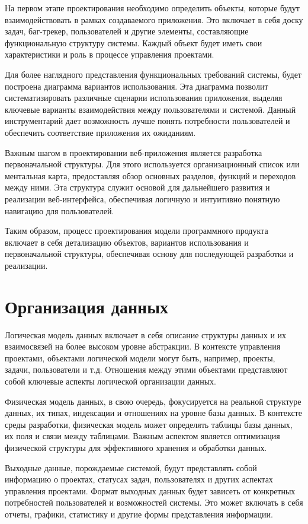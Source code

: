 \documentclass[12pt,a4paper,draft]{report}
\begin{document}
На первом этапе проектирования необходимо определить объекты, которые будут взаимодействовать в рамках создаваемого приложения.
Это включает в себя доску задач, баг-трекер, пользователей и другие элементы, составляющие функциональную структуру системы.
Каждый объект будет иметь свои характеристики и роль в процессе управления проектами.

Для более наглядного представления функциональных требований системы, будет построена диаграмма вариантов использования.
Эта диаграмма позволит систематизировать различные сценарии использования приложения, выделяя ключевые варианты взаимодействия между пользователями и системой.
Данный инструментарий дает возможность лучше понять потребности пользователей и обеспечить соответствие приложения их ожиданиям.

Важным шагом в проектировании веб-приложения является разработка первоначальной структуры.
Для этого используется организационный список или ментальная карта, предоставляя обзор основных разделов, функций и переходов между ними.
Эта структура служит основой для дальнейшего развития и реализации веб-интерфейса, обеспечивая логичную и интуитивно понятную навигацию для пользователей.

Таким образом, процесс проектирования модели программного продукта включает в себя детализацию объектов, вариантов использования и первоначальной структуры, обеспечивая основу для последующей разработки и реализации.

\section{Организация данных}

Логическая модель данных включает в себя описание структуры данных и их взаимосвязей на более высоком уровне абстракции.
В контексте управления проектами, объектами логической модели могут быть, например, проекты, задачи, пользователи и т.д.
Отношения между этими объектами представляют собой ключевые аспекты логической организации данных.

Физическая модель данных, в свою очередь, фокусируется на реальной структуре данных, их типах, индексации и отношениях на уровне базы данных.
В контексте среды разработки, физическая модель может определять таблицы базы данных, их поля и связи между таблицами. Важным аспектом является оптимизация физической структуры для эффективного хранения и обработки данных.

Выходные данные, порождаемые системой, будут представлять собой информацию о проектах, статусах задач, пользователях и других аспектах управления проектами.
Формат выходных данных будет зависеть от конкретных потребностей пользователей и возможностей системы. Это может включать в себя отчеты, графики, статистику и другие формы представления информации.
\end{document}
